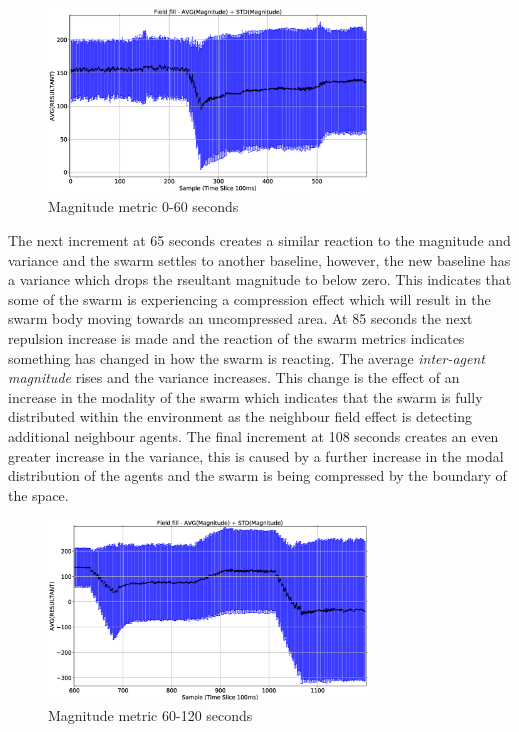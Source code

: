 \documentclass[10pt,journal,letterpaper,twoside]{IEEEtran}
\begin{document}
\begin{figure}
\begin{center}
\includegraphics[width=8.5cm]{figures/FIELDFILL-MAG-1}
\end{center}
\caption{Magnitude metric 0-60 seconds\label{emerge:FIELDFILL-MAG-1}}
\end{figure}

The next increment at 65 seconds creates a similar reaction to the magnitude and variance and the swarm settles to another baseline, however, the new baseline has a variance which drops the rseultant magnitude to below zero. This indicates that some of the swarm is experiencing a compression effect which will result in the swarm body moving towards an uncompressed area. At 85 seconds the next repulsion increase is made and the reaction of the swarm metrics indicates something has changed in how the swarm is reacting. The average \textit{inter-agent magnitude} rises and the variance increases. This change is the effect of an increase in the modality of the swarm which indicates that the swarm is fully distributed within the environment as the neighbour field effect is detecting additional neighbour agents. The final increment at 108 seconds creates an even greater increase in the variance, this is caused by a further increase in the modal distribution of the agents and the swarm is being compressed by the boundary of the space.

\begin{figure}
\begin{center}
\includegraphics[width=8.5cm]{figures/FIELDFILL-MAG-2}
\end{center}
\caption{Magnitude metric 60-120 seconds\label{emerge:FIELDFILL-MAG-2}}
\end{figure}
\end{document}
